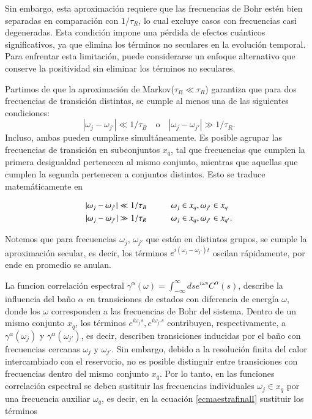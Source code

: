 Sin embargo, esta aproximación requiere que las frecuencias de Bohr estén bien separadas en comparación con \( 1/\tau_R \), lo cual excluye casos con frecuencias casi degeneradas. Esta condición impone una pérdida de efectos cuánticos significativos, ya que elimina los términos no seculares en la evolución temporal\cite{trushechkin2021unified}. Para enfrentar esta limitación, puede considerarse un enfoque alternativo que conserve la positividad sin eliminar los términos no seculares. 

Partimos de que la aproximación de Markov($\tau_{B} \ll \tau_{R}$) garantiza que para dos frecuencias de transición distintas, se cumple al menos una de las siguientes condiciones:
\[
|\omega_j - \omega_{j'}| \ll 1/\tau_B \quad \text{o} \quad |\omega_j - \omega_{j'}| \gg 1/\tau_R.
\]
Incluso, ambas pueden cumplirse simultáneamente. Es posible agrupar las frecuencias de transición en subconjuntos \( x_q \), tal que frecuencias que cumplen la primera desigualdad pertenecen al mismo conjunto, mientras que aquellas que cumplen la segunda pertenecen a conjuntos distintos. Esto se traduce matemáticamente en


\begin{align*}
    |\omega_{j}-\omega_{j'}| \ll 1/\tau_{B}  &\hspace{10mm} \omega_{j} \in x_{q}, \omega_{j'} \in x_{q} \\
    |\omega_{j}-\omega_{j'}| \gg 1/\tau_{R}  &\hspace{10mm} \omega_{j} \in x_{q}, \omega_{j'} \in x_{q'}.
\end{align*}

Notemos que para frecuencias $\omega_{j}$, $\omega_{j'}$ que están en distintos grupos, se cumple la aproximación secular, es decir, los términos $e^{i(\omega_{j} - \omega_{j'})t}$ oscilan rápidamente, por ende en  promedio se anulan.

La funcion correlación  espectral $\gamma^{\alpha}(\omega) = \int_{-\infty}^{\infty} ds e^{i \omega s} C^{\alpha}(s)$, describe la influencia del baño $\alpha$ en transiciones de estados con diferencia de energía $\omega$, donde los $\omega$ corresponden a las frecuencias de Bohr del sistema. Dentro de un mismo conjunto $x_{q}$, los términos $e^{i\omega_{j}s},e^{i\omega_{j'}s}$ contribuyen, respectivamente, a  $\gamma^{\alpha}(\omega_{j})$ y $\gamma^{\alpha}(\omega_{j'})$, es decir,  describen transiciones inducidas por el baño con frecuencias cercanas $\omega_{j}$ y $\omega_{j'}$. Sin embargo, debido a la resolución finita del calor intercambiado con el reservorio, no es posible distinguir entre transiciones con frecuencias dentro del mismo conjunto $x_q$. Por lo tanto, en las funciones correlación espectral se deben sustituir las frecuencias individuales $\omega_{j} \in x_{q}$ por una frecuencia auxiliar $\omega_{q}$, es decir, en la ecuación \ref{ecmaestrafinalI} sustituir los términos  

